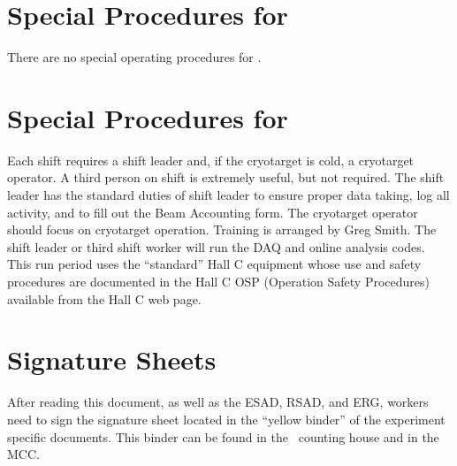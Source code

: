 %
\newpage
\section{Special Procedures for \HALL}

There are no special operating procedures for \HALL{}.

%
\newpage
\section{Special Procedures for \EXPTS}

Each shift requires a shift leader and, if the cryotarget is cold, a cryotarget 
operator.  A third person on shift is extremely useful, but not required. The shift leader 
has the standard
duties of shift leader to ensure proper data taking, log all activity, and to fill out
the Beam Accounting form. The cryotarget operator should focus on cryotarget
operation. Training is arranged by Greg Smith. The shift leader or third
shift worker will run the DAQ and online analysis codes.
This run period uses the ``standard'' Hall C equipment whose
use and safety procedures are documented in the Hall C OSP (Operation Safety
Procedures) available from the Hall C web page.


\newpage
\section{Signature Sheets}

After reading this document, as well as the ESAD, RSAD, and ERG, workers need to sign
the signature sheet located in the ``yellow binder'' of the experiment specific documents.
This binder can be found in the \HALL\ counting house and in the MCC.

